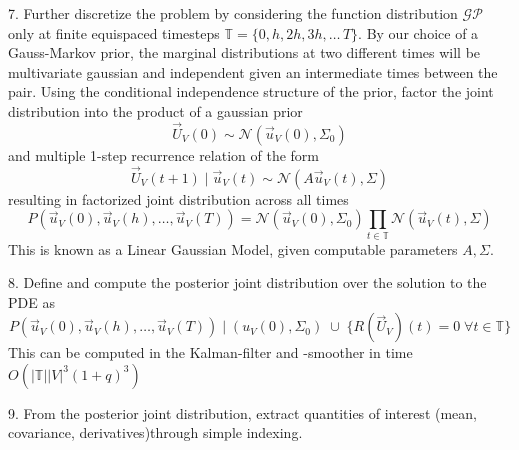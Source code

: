 7. Further discretize the problem by considering the function distribution $\mathcal{GP}$ only at finite equispaced timesteps $\mathbb{T} = \{0, h, 2h, 3h, \dots\, T\}$. By our choice of a Gauss-Markov prior, the marginal distributions at two different times will be multivariate gaussian and independent given an intermediate times between the pair. Using the conditional independence structure of the prior, factor the joint distribution into the product of a gaussian prior $$\vec{U}_V(0) \sim \mathcal{N}(\vec{u}_V(0), \Sigma_0)$$ and multiple 1-step recurrence relation of the form $$\vec{U}_V(t+1) \;|\; \vec{u}_V(t) \sim \mathcal{N}(A\vec{u}_V(t), \Sigma)$$ 
resulting in factorized joint distribution across all times $$P(\vec{u}_V(0), \vec{u}_V(h), \dots, \vec{u}_V(T)) = \mathcal{N}(\vec{u}_V(0), \Sigma _0)\prod_{t\in \mathbb{T}} \mathcal{N}(\vec{u}_V(t), \Sigma)$$
This is known as a Linear Gaussian Model, given computable parameters $A, \Sigma$.

8. Define and compute the posterior joint distribution over the solution to the PDE as $$P(\vec{u}_V(0), \vec{u}_V(h), \dots, \vec{u}_V(T)) \;\Big| \; (u_V(0), \Sigma_0) \; \cup \; \{R(\vec{U}_V)(t) = 0 \; \forall t \in \mathbb{T}\}$$ This can be computed in the Kalman-filter and -smoother in time $O(|\mathbb{T}||V|^3(1+q)^3)$

9. From the posterior joint distribution, extract quantities of interest (mean, covariance, derivatives)through simple indexing.

\ifdefined\COMPILINGFROMMAIN
\else    
    
\fi